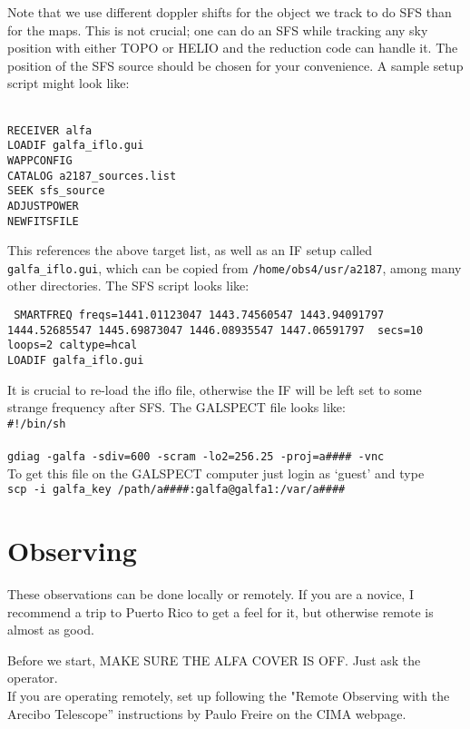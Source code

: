 Note that we use different doppler shifts for the object we track to do SFS than for the maps. This is not crucial; one can do an SFS while tracking any sky position with either TOPO or HELIO and the reduction code can handle it. The position of the SFS source should be chosen for your convenience. A sample setup script might look like:

\texttt{\\
RECEIVER alfa\\
LOADIF galfa\_iflo.gui\\
WAPPCONFIG\\
CATALOG a2187\_sources.list\\
SEEK sfs\_source\\
ADJUSTPOWER\\
NEWFITSFILE\\
}

This references the above target list, as well as an IF setup called \texttt{galfa\_iflo.gui}, which can be copied from \texttt{/home/obs4/usr/a2187}, among many other directories. The SFS script looks like:

\texttt{
SMARTFREQ freqs={1441.01123047 1443.74560547 1443.94091797 1444.52685547 1445.69873047 1446.08935547 1447.06591797 } secs=10 loops=2 caltype=hcal\\
LOADIF galfa\_iflo.gui\\
}

It is crucial to re-load the iflo file, otherwise the IF will be left set to some strange frequency after SFS. The GALSPECT file looks like:
\texttt{\\
\#!/bin/sh\\
\\
gdiag -galfa -sdiv=600 -scram -lo2=256.25 -proj=a\#\#\#\# -vnc
}
\\
To get this file on the GALSPECT computer just login as `guest' and type
\\
\texttt{scp -i galfa\_key /path/a\#\#\#\#:galfa@galfa1:/var/a\#\#\#\#}

\section{Observing}

These observations can be done locally or remotely. If you are a novice, I recommend a trip to Puerto Rico to get a feel for it, but otherwise remote is almost as good.

Before we start, MAKE SURE THE ALFA COVER IS OFF. Just ask the operator. \\
If you are operating remotely, set up following the "Remote Observing with the Arecibo Telescope'' instructions by Paulo Freire on the CIMA webpage. 

